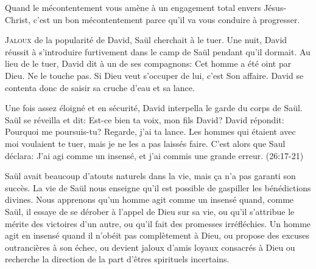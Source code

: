 
Quand le mécontentement vous amène à un engagement total envers Jésus-Christ,
 c'est un bon mécontentement parce qu'il va vous conduire à progresser.

\dvrule







\lettrine{J}{aloux} de la popularité de David, Saül cherchait à le tuer.
 Une nuit, David réussit à s'introduire furtivement dans le camp de Saül
 pendant qu'il dormait. Au lieu de le tuer, David dit à un de ses compagnons:
 \Og Cet homme a été oint par Dieu. Ne le touche pas.
 Si Dieu veut s'occuper de lui, c'est Son affaire. \Fg{}
 David se contenta donc de saisir sa cruche d'eau et sa lance.

Une fois assez éloigné et en sécurité, David interpella
 le garde du corps de Saül.
 Saül se réveilla et dit:
 \Og Est-ce bien ta voix, mon fils David? \Fg{}
 David répondit:
 \Og Pourquoi me poursuis-tu? Regarde, j'ai ta lance.
 Les hommes qui étaient avec moi voulaient te tuer,
 mais je ne les a pas laissés faire. \Fg{}
 C'est alors que Saul déclara:
 \Og J'ai agi comme un insensé, et j'ai commis une grande erreur. \Fg{}
 (26:17-21)

Saül avait beaucoup d'atouts naturels dans la vie,
 mais \c{c}a n'a pas garanti son succès.
 La vie de Saül nous enseigne qu'il est possible
 de gaspiller les bénédictions divines.
 Nous apprenons qu'un homme agit comme un insensé quand,
 comme Saül, il essaye de se dérober à l'appel de Dieu sur sa vie,
 ou qu'il s'attribue le mérite des victoires d'un autre,
 ou qu'il fait des promesses irréfléchies.
 Un homme agit en insensé quand il n'obéit pas complètement à Dieu,
 ou propose des excuses outrancières à son échec,
 ou devient jaloux d'amis loyaux consacrés à Dieu
 ou recherche la direction de la part d'êtres spirituels incertains.

